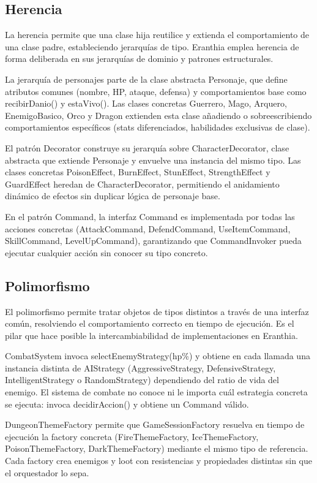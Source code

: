 \documentclass[stu,12pt,floatsintext]{apa7}
\begin{document}
\subsection{Herencia}

La herencia permite que una clase hija reutilice y extienda el comportamiento de una clase padre, estableciendo jerarquías de tipo. Eranthia emplea herencia de forma deliberada en sus jerarquías de dominio y patrones estructurales.

La jerarquía de personajes parte de la clase abstracta Personaje, que define atributos comunes (nombre, HP, ataque, defensa) y comportamientos base como recibirDanio() y estaVivo(). Las clases concretas Guerrero, Mago, Arquero, EnemigoBasico, Orco y Dragon extienden esta clase añadiendo o sobreescribiendo comportamientos específicos (stats diferenciados, habilidades exclusivas de clase).

El patrón Decorator construye su jerarquía sobre CharacterDecorator, clase abstracta que extiende Personaje y envuelve una instancia del mismo tipo. Las clases concretas PoisonEffect, BurnEffect, StunEffect, StrengthEffect y GuardEffect heredan de CharacterDecorator, permitiendo el anidamiento dinámico de efectos sin duplicar lógica de personaje base.

En el patrón Command, la interfaz Command es implementada por todas las acciones concretas (AttackCommand, DefendCommand, UseItemCommand, SkillCommand, LevelUpCommand), garantizando que CommandInvoker pueda ejecutar cualquier acción sin conocer su tipo concreto.

\subsection{Polimorfismo}

El polimorfismo permite tratar objetos de tipos distintos a través de una interfaz común, resolviendo el comportamiento correcto en tiempo de ejecución. Es el pilar que hace posible la intercambiabilidad de implementaciones en Eranthia.

CombatSystem invoca selectEnemyStrategy(hp\%) y obtiene en cada llamada una instancia distinta de AIStrategy (AggressiveStrategy, DefensiveStrategy, IntelligentStrategy o RandomStrategy) dependiendo del ratio de vida del enemigo. El sistema de combate no conoce ni le importa cuál estrategia concreta se ejecuta: invoca decidirAccion() y obtiene un Command válido.

DungeonThemeFactory permite que GameSessionFactory resuelva en tiempo de ejecución la factory concreta (FireThemeFactory, IceThemeFactory, PoisonThemeFactory, DarkThemeFactory) mediante el mismo tipo de referencia. Cada factory crea enemigos y loot con resistencias y propiedades distintas sin que el orquestador lo sepa.
\end{document}
